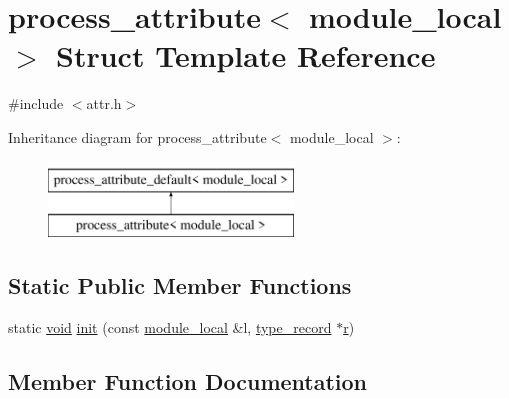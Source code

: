 \hypertarget{structprocess__attribute_3_01module__local_01_4}{}\section{process\+\_\+attribute$<$ module\+\_\+local $>$ Struct Template Reference}
\label{structprocess__attribute_3_01module__local_01_4}


{\ttfamily \#include $<$attr.\+h$>$}

Inheritance diagram for process\+\_\+attribute$<$ module\+\_\+local $>$\+:\begin{figure}[H]
\begin{center}
\leavevmode
\includegraphics[height=2.000000cm]{structprocess__attribute_3_01module__local_01_4}
\end{center}
\end{figure}
\subsection*{Static Public Member Functions}
\begin{DoxyCompactItemize}
\item 
static \mbox{\hyperlink{_s_d_l__opengles2__gl2ext_8h_ae5d8fa23ad07c48bb609509eae494c95}{void}} \mbox{\hyperlink{structprocess__attribute_3_01module__local_01_4_ad282d6e942f93ec73183e96c4197e3fb}{init}} (const \mbox{\hyperlink{structmodule__local}{module\+\_\+local}} \&l, \mbox{\hyperlink{structtype__record}{type\+\_\+record}} $\ast$\mbox{\hyperlink{_s_d_l__opengl_8h_a42ce7cdc612e53abee15043f80220d97}{r}})
\end{DoxyCompactItemize}


\subsection{Member Function Documentation}
\mbox{\label{structprocess__attribute_3_01module__local_01_4_ad282d6e942f93ec73183e96c4197e3fb}} 
